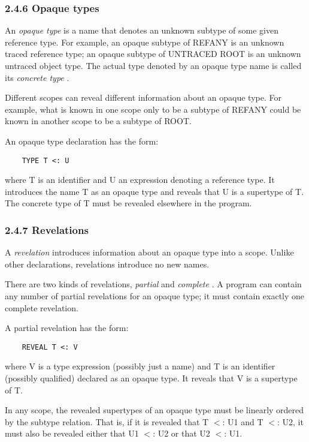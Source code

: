 \documentclass[10pt]{article}
\begin{document}
 
\subsubsection*{2.4.6 Opaque types}


  An \emph{opaque type}
 is a name that denotes an unknown subtype of some given reference type. For example, an opaque subtype of REFANY is an unknown traced reference type; an opaque subtype of UNTRACED ROOT is an unknown untraced object type. The actual type denoted by an opaque type name is called its \emph{concrete type}
. 


  Different scopes can reveal different information about an opaque type. For example, what is known in one scope only to be a subtype of REFANY could be known in another scope to be a subtype of ROOT. 


  An opaque type declaration has the form: 
\begin{verbatim}
    TYPE T <: U
\end{verbatim}
 where T is an identifier and U an expression denoting a reference type. It introduces the name T as an opaque type and reveals that U is a supertype of T. The concrete type of T must be revealed elsewhere in the program. 


 
\subsubsection*{2.4.7 Revelations}


  A \emph{revelation}
 introduces information about an opaque type into a scope. Unlike other declarations, revelations introduce no new names. 


  There are two kinds of revelations, \emph{partial}
 and \emph{complete}
. A program can contain any number of partial revelations for an opaque type; it must contain exactly one complete revelation. 


 A partial revelation has the form: 
\begin{verbatim}
    REVEAL T <: V
\end{verbatim}
 where V is a type expression (possibly just a name) and T is an identifier (possibly qualified) declared as an opaque type. It reveals that V is a supertype of T. 


  In any scope, the revealed supertypes of an opaque type must be linearly ordered by the subtype relation. That is, if it is revealed that T $<$: U1 and T $<$: U2, it must also be revealed either that U1 $<$: U2 or that U2 $<$: U1. 
\end{document}
